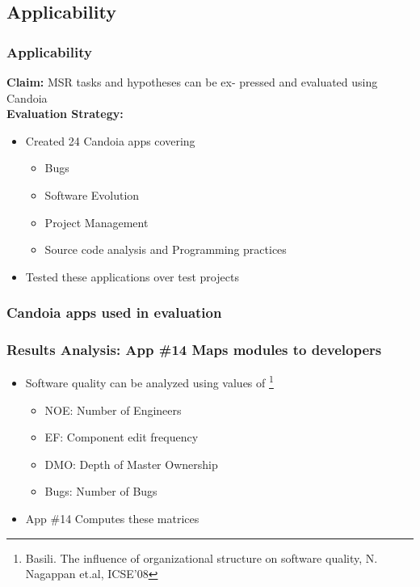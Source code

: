     \subsection{Applicability}
        \begin{frame}
            \frametitle{Applicability}
                \textbf{Claim:} MSR tasks and hypotheses can be ex- pressed and evaluated using Candoia \\
             \textbf{Evaluation Strategy:}
            \begin{itemize}
                \item Created 24 Candoia apps covering
                \begin{itemize}
                    \item Bugs
                    \item Software Evolution
                    \item Project Management
                    \item Source code analysis and Programming practices
                \end{itemize}
                \item Tested these applications over test projects
            \end{itemize}
         \end{frame}

        \begin{frame}
            \frametitle{Candoia apps used in evaluation}
            
         \end{frame}

        \begin{frame}
            \frametitle{Results Analysis: App \#14 Maps modules to developers}
                \begin{itemize}
                    \item Software quality can be analyzed using values of \footnote{ \tiny{Basili. The
                    influence of organizational structure on software quality, N. Nagappan et.al, ICSE'08}}
                    \begin{itemize}
                        \item NOE: Number of Engineers
                        \item EF: Component edit frequency
                        \item DMO: Depth of Master Ownership
                        \item Bugs: Number of Bugs
                    \end{itemize}
                    \item App \#14 Computes these matrices
                \end{itemize}
        \end{frame}

